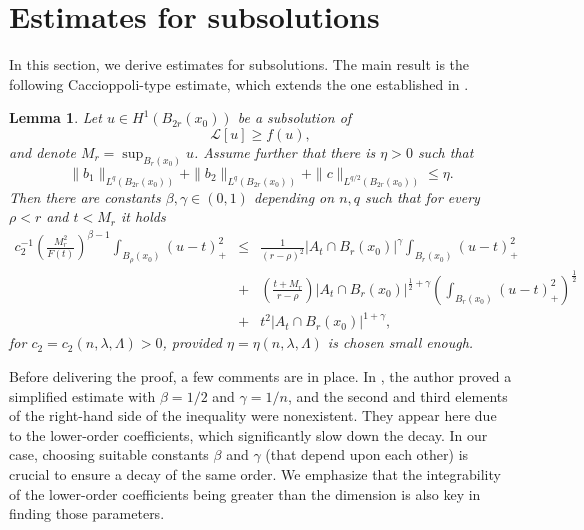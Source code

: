 \documentclass[12pt,a4paper]{amsart}
\numberwithin{equation}{section} %
\newtheorem{lemma}[theorem]{Lemma}
\theoremstyle{definition}
\theoremstyle{remark}
\begin{document}
\section{Estimates for subsolutions}\label{subsolution-sct}

In this section, we derive estimates for subsolutions. The main result is the following Caccioppoli-type estimate, which extends the one established in \cite{VJ1}.

\begin{lemma}\label{di giorgi iteration}
Let $u \in H^1(B_{2r}(x_0))$ be a subsolution of
$$
    \mathcal{L}[u] \geq f(u),
$$
and denote $M_r = \sup_{B_r(x_0)}u$. Assume further that there is $\eta>0$ such that
\begin{equation}\label{coefs universally small}
    \|b_1\|_{L^{q}(B_{2r}(x_0))} + \|b_2\|_{L^{q}(B_{2r}(x_0))} + \|c\|_{L^{q/2}(B_{2r}(x_0))} \leq \eta.
\end{equation}
Then there are constants $\beta, \gamma \in (0,1)$ depending on $n,q$ such that for every $\rho < r$ and $t < M_r$ it holds
\begin{eqnarray*}
    c_2^{-1} \left(\frac{M_r^2}{F(t)} \right)^{\beta-1} \int_{B_\rho(x_0)}(u-t)_+^2 & \leq & \frac{1}{(r-\rho)^2}|A_t \cap B_r(x_0)|^{\gamma} \int_{B_r(x_0)} (u-t)_+^2 \\
    & + & \left(\frac{t+M_r}{r-\rho}\right)|A_t \cap B_r(x_0)|^{\frac{1}{2} + \gamma}\left(\int_{B_r(x_0)}(u-t)^2_+ \right)^{\frac{1}{2}}\\
    & + & t^2|A_t \cap B_r(x_0)|^{1 + \gamma},
\end{eqnarray*}
for $c_2 = c_2(n,\lambda,\Lambda)>0$, provided $\eta=\eta(n,\lambda,\Lambda)$ is chosen small enough.
\end{lemma}

Before delivering the proof, a few comments are in place. In \cite{VJ1}, the author proved a simplified estimate with $\beta = 1/2$ and $\gamma = 1/n$, and the second and third elements of the right-hand side of the inequality were nonexistent. They appear here due to the lower-order coefficients, which significantly slow down the decay. In our case, choosing suitable constants $\beta$ and $\gamma$ (that depend upon each other) is crucial to ensure a decay of the same order. We emphasize that the integrability of the lower-order coefficients being greater than the dimension is also key in finding those parameters.
\end{document}

